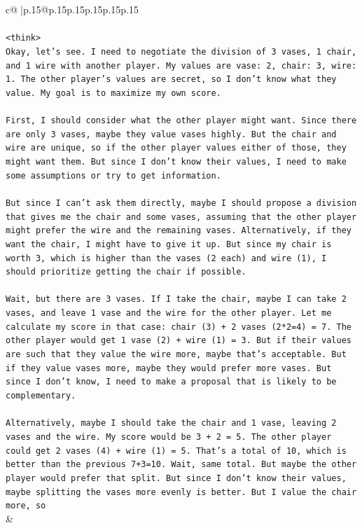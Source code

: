 \documentclass{article}
\begin{document}
{\begin{supertabular}{c@{$\;$}|p{.15\linewidth}@{}p{.15\linewidth}p{.15\linewidth}p{.15\linewidth}p{.15\linewidth}p{.15\linewidth}}
{{{\\ 
\\ 
\texttt{<think>} \\
\texttt{Okay, let's see. I need to negotiate the division of 3 vases, 1 chair, and 1 wire with another player. My values are vase: 2, chair: 3, wire: 1. The other player's values are secret, so I don't know what they value. My goal is to maximize my own score.} \\
\\ 
\texttt{First, I should consider what the other player might want. Since there are only 3 vases, maybe they value vases highly. But the chair and wire are unique, so if the other player values either of those, they might want them. But since I don't know their values, I need to make some assumptions or try to get information.} \\
\\ 
\texttt{But since I can't ask them directly, maybe I should propose a division that gives me the chair and some vases, assuming that the other player might prefer the wire and the remaining vases. Alternatively, if they want the chair, I might have to give it up. But since my chair is worth 3, which is higher than the vases (2 each) and wire (1), I should prioritize getting the chair if possible.} \\
\\ 
\texttt{Wait, but there are 3 vases. If I take the chair, maybe I can take 2 vases, and leave 1 vase and the wire for the other player. Let me calculate my score in that case: chair (3) + 2 vases (2*2=4) = 7. The other player would get 1 vase (2) + wire (1) = 3. But if their values are such that they value the wire more, maybe that's acceptable. But if they value vases more, maybe they would prefer more vases. But since I don't know, I need to make a proposal that is likely to be complementary.} \\
\\ 
\texttt{Alternatively, maybe I should take the chair and 1 vase, leaving 2 vases and the wire. My score would be 3 + 2 = 5. The other player could get 2 vases (4) + wire (1) = 5. That's a total of 10, which is better than the previous 7+3=10. Wait, same total. But maybe the other player would prefer that split. But since I don't know their values, maybe splitting the vases more evenly is better. But I value the chair more, so} \\
            }
        }
    }
    & \\ \\


\end{supertabular}}
\end{document}
